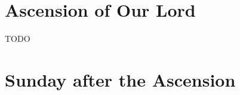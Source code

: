 {{
\section{Ascension of Our Lord}
\subtitle{1st Class}
TODO
}

{
\section{Sunday after the Ascension}
\subtitle{2nd Class}
\def\printfullhymn{
    {
        \printhymn{\oldstylenums{\hymnlinetwo}}{\hymninitial}{\hymntex}{\hymntranslation}
        \def\vrlinebreak{T}
        \printvr[\greblockcustos]{\vrtex}{\vtranslation}{\rtranslation}
    }
}
\benedicamusdomino{}
}
}